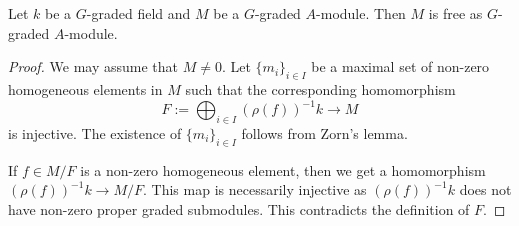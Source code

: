 \begin{proposition}
    Let $k$ be a $G$-graded field and $M$ be a $G$-graded $A$-module. Then $M$ is free as $G$-graded $A$-module.
\end{proposition}
\begin{proof}
    We may assume that $M\neq 0$.
    Let $\{m_i\}_{i\in I}$ be a maximal set of non-zero homogeneous elements in $M$ such that the corresponding homomorphism 
    \[
        F:=\bigoplus_{i\in I} (\rho(f))^{-1}k\rightarrow M  
    \] 
    is injective. The existence of $\{m_i\}_{i\in I}$ follows from Zorn's lemma.

    If $f\in M/F$ is a non-zero homogeneous element, then we get a homomorphism $(\rho(f))^{-1}k\rightarrow M/F$. This map is necessarily injective as $(\rho(f))^{-1}k$ does not have non-zero proper graded submodules. This contradicts the definition of $F$.
\end{proof}


\printbibliography
